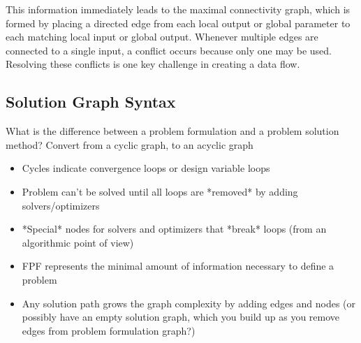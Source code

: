     This information immediately leads to the maximal connectivity graph, which is formed by placing a directed edge from each local output or global parameter to each matching local input or global output. 
    Whenever multiple edges are connected to a single input, a conflict occurs because only one may be used. Resolving these conflicts is one key challenge in creating a data flow.

    \subsection{Solution Graph Syntax}
    What is the difference between a problem formulation and a problem solution method? Convert from a cyclic graph, to an acyclic graph
    \begin{itemize}
        \item Cycles indicate convergence loops or design variable loops
        \item Problem can't be solved until all loops are *removed* by adding solvers/optimizers
        \item *Special* nodes for solvers and optimizers that *break* loops (from an algorithmic point of view)
        \item FPF represents the minimal amount of information necessary to define a problem
        \item Any solution path grows the graph complexity by adding edges and nodes (or possibly have an empty solution graph, which you build up
        as you remove edges from problem formulation graph?)
    \end{itemize}
